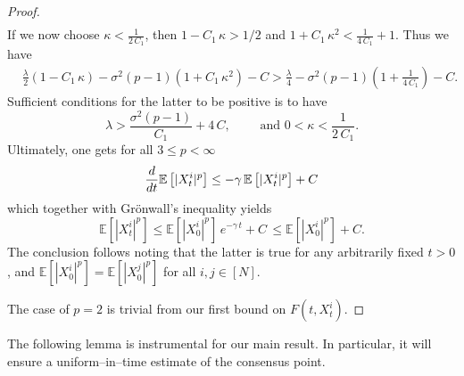 \documentclass[12pt]{amsart}
\newcommand{\rd}{{\rm d} }
\numberwithin{equation}{section}
\begin{document}
\begin{proof}
\begin{align*}
\end{align*}
If we now choose $\kappa<\frac{1}{2\,C_{1}}$, then $1-C_{1}\,\kappa>1/2$ and $1+C_{1}\,\kappa^{2}< \frac{1}{4\,C_{1}}+ 1$. Thus we have
\begin{align*}
    & \frac{\lambda}{2}\left(1 -C_{1}\,\kappa\right) - \sigma^{2}(p-1)\left(1+C_{1}\,\kappa^{2}\right) - C  > \frac{\lambda}{4} - \sigma^{2}(p-1)\left(1+\frac{1}{4\,C_{1}}\right) - C.
\end{align*}
Sufficient conditions for the latter to be positive is to have
\begin{equation}
\label{configuration}
    \lambda > \frac{\sigma^{2}(p-1)}{C_{1}} + 4 \,C,\quad \quad \text{ and } 0<\kappa < \frac{1}{2\,C_{1}}.
\end{equation}
Ultimately, one gets for all $3\leq p<\infty$
\begin{equation*}
    \frac{\rd}{\rd t}\mathbb{E}\left[|X^{i}_{t}|^{p}\right] \leq -\gamma\,\mathbb{E}\left[|X_{t}^{i}|^{p}\right] + C
\end{equation*}
which together with Gr\"{o}nwall's inequality yields
\begin{equation*}
    \mathbb{E}\left[ |X^{i}_{t}|^{p} \right] \leq \mathbb{E}\left[ |X^{i}_{0}|^{p} \right]\, e^{-\gamma\,t } + C \, \leq \mathbb{E}\left[ |X^{i}_{0}|^{p} \right] + C.
\end{equation*}
The conclusion follows noting that the latter is true for any arbitrarily fixed $t>0$, and $\mathbb{E}\left[ |X^{i}_{0}|^{p} \right] = \mathbb{E}\left[ |X^{j}_{0}|^{p} \right]$ for all $i,j \in [N]$. 


The case of $p=2$ is trivial from our first bound on $F(t,X^{i}_{t})$. 
\end{proof}



The following lemma is instrumental for our main result. In particular, it will ensure a uniform--in--time estimate of the consensus point.
\end{document}

